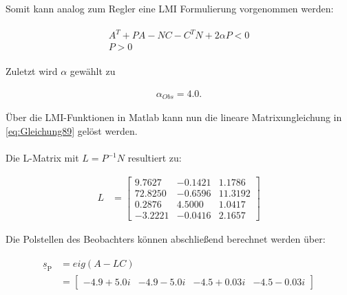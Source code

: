 Somit kann analog zum Regler eine LMI Formulierung vorgenommen werden:

\begin{align} \label{eq:Gleichung89}
    \begin{split}
        A^T + PA - NC - C^TN + 2\alpha P < 0 \\
        P > 0
    \end{split}
\end{align}

Zuletzt wird $\alpha$ gewählt zu

\begin{align*}
    \alpha _{Obs} = 4.0.
\end{align*}

Über die LMI-Funktionen in Matlab kann nun die lineare Matrixungleichung in \autoref{eq:Gleichung89} gelöst werden.\\\\
Die L-Matrix mit $L = P^{-1}N$ resultiert zu:

\begin{align}
    L &= 
    \begin{bmatrix}
        9.7627 & -0.1421 & 1.1786 \\
        72.8250 & -0.6596 & 11.3192 \\
        0.2876 & 4.5000 & 1.0417 \\
        -3.2221 & -0.0416 & 2.1657
    \end{bmatrix}
\end{align}

Die Polstellen des Beobachters können abschließend berechnet werden über:

\begin{align}
    \begin{split}
        \underline{s}_{\mathrm{P}} &= eig(A - LC) \\&=
        \begin{bmatrix}
            -4.9 + 5.0i & -4.9 - 5.0i & -4.5 + 0.03i & -4.5 - 0.03i
        \end{bmatrix}
    \end{split}
\end{align}

